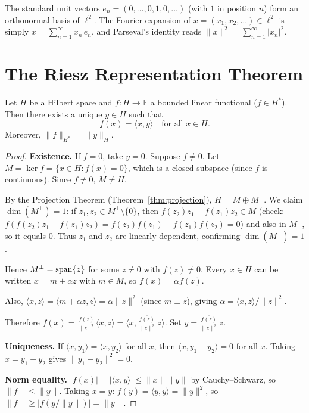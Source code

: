 \documentclass[11pt,a4paper]{article}
\begin{document}
\begin{example}
\label{ex:standard-onb}
The standard unit vectors $e_n = (0, \ldots, 0, 1, 0, \ldots)$ (with $1$
in position $n$) form an orthonormal basis of $\ell^2$. The Fourier
expansion of $x = (x_1, x_2, \ldots) \in \ell^2$ is simply
$x = \sum_{n=1}^\infty x_n\, e_n$, and Parseval's identity reads
$\|x\|^2 = \sum_{n=1}^\infty |x_n|^2$.
\end{example}


\section{The Riesz Representation Theorem}
\label{sec:riesz}

\begin{theorem}
\label{thm:riesz}
Let $H$ be a Hilbert space and $f \colon H \to \mathbb{F}$ a bounded
linear functional ($f \in H^*$). Then there exists a unique $y \in H$
such that
\[
    f(x) = \langle x, y \rangle \quad \text{for all } x \in H.
\]
Moreover, $\|f\|_{H^*} = \|y\|_H$.
\end{theorem}

\begin{proof}
\textbf{Existence.} If $f = 0$, take $y = 0$. Suppose $f \neq 0$. Let
$M = \ker f = \{x \in H : f(x) = 0\}$, which is a closed subspace
(since $f$ is continuous). Since $f \neq 0$, $M \neq H$.

By the Projection Theorem (Theorem~\ref{thm:projection}),
$H = M \oplus M^\perp$. We claim $\dim(M^\perp) = 1$: if
$z_1, z_2 \in M^\perp \setminus \{0\}$, then
$f(z_2) z_1 - f(z_1) z_2 \in M$ (check:
$f(f(z_2) z_1 - f(z_1) z_2) = f(z_2)f(z_1) - f(z_1)f(z_2) = 0$)
and also in $M^\perp$, so it equals $0$. Thus $z_1$ and $z_2$ are
linearly dependent, confirming $\dim(M^\perp) = 1$.

Hence $M^\perp = \operatorname{span}\{z\}$ for some $z \neq 0$ with $f(z) \neq 0$.
Every $x \in H$ can be written $x = m + \alpha z$ with $m \in M$, so
$f(x) = \alpha f(z)$.

Also, $\langle x, z \rangle = \langle m + \alpha z, z \rangle
= \alpha \|z\|^2$ (since $m \perp z$), giving
$\alpha = \langle x, z \rangle / \|z\|^2$.

Therefore
$f(x) = \frac{f(z)}{\|z\|^2} \langle x, z \rangle
= \langle x, \frac{\overline{f(z)}}{\|z\|^2}\, z \rangle$.
Set $y = \frac{\overline{f(z)}}{\|z\|^2}\, z$.

\textbf{Uniqueness.} If $\langle x, y_1 \rangle = \langle x, y_2 \rangle$
for all $x$, then $\langle x, y_1 - y_2 \rangle = 0$ for all $x$.
Taking $x = y_1 - y_2$ gives $\|y_1 - y_2\|^2 = 0$.

\textbf{Norm equality.}
$|f(x)| = |\langle x, y \rangle| \leq \|x\| \|y\|$ by
Cauchy--Schwarz, so $\|f\| \leq \|y\|$. Taking $x = y$:
$f(y) = \langle y, y \rangle = \|y\|^2$, so
$\|f\| \geq |f(y/\|y\|)| = \|y\|$.
\end{proof}
\end{document}
